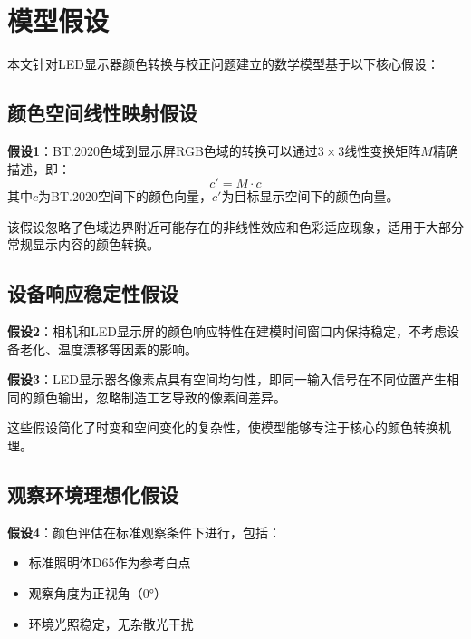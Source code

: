 \chapter[\hspace{0pt}模型假设]{{\heiti{}\hspace{0pt}模型假设}}\label{chapter2:模型假设}

\removelofgap
\removelotgap

本文针对LED显示器颜色转换与校正问题建立的数学模型基于以下核心假设：

\section[\hspace{-2pt}颜色空间线性映射假设]{{\heiti{} \hspace{-8pt}颜色空间线性映射假设}}\label{section2: 颜色空间线性映射假设}

\textbf{假设1}：BT.2020色域到显示屏RGB色域的转换可以通过$3\times 3$线性变换矩阵$M$精确描述，即：
$$c' = M \cdot c$$
其中$c$为BT.2020空间下的颜色向量，$c'$为目标显示空间下的颜色向量。

该假设忽略了色域边界附近可能存在的非线性效应和色彩适应现象，适用于大部分常规显示内容的颜色转换。

\section[\hspace{-2pt}设备响应稳定性假设]{{\heiti{} \hspace{-8pt}设备响应稳定性假设}}\label{section2: 设备响应稳定性假设}

\textbf{假设2}：相机和LED显示屏的颜色响应特性在建模时间窗口内保持稳定，不考虑设备老化、温度漂移等因素的影响。

\textbf{假设3}：LED显示器各像素点具有空间均匀性，即同一输入信号在不同位置产生相同的颜色输出，忽略制造工艺导致的像素间差异。

这些假设简化了时变和空间变化的复杂性，使模型能够专注于核心的颜色转换机理。

\section[\hspace{-2pt}观察环境理想化假设]{{\heiti{} \hspace{-8pt}观察环境理想化假设}}\label{section2: 观察环境理想化假设}

\textbf{假设4}：颜色评估在标准观察条件下进行，包括：
\begin{itemize}
    \item 标准照明体D65作为参考白点
    \item 观察角度为正视角（0°）
    \item 环境光照稳定，无杂散光干扰
\end{itemize}

